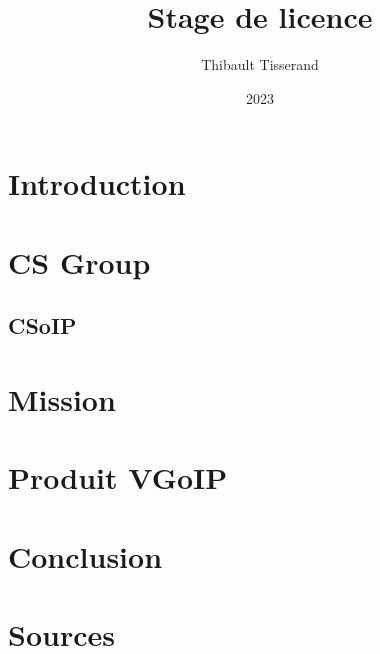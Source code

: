 \documentclass{beamer}
\title{Stage de licence}
\author{Thibault Tisserand}
\institute{Université de Lille}
\date{2023}
\begin{document}
\titlepage



\section{Introduction}


\section{CS Group}


\subsection{CSoIP}


\section{Mission}


\section{Produit VGoIP}


\section{Conclusion}


\section{Sources}

\end{document}
